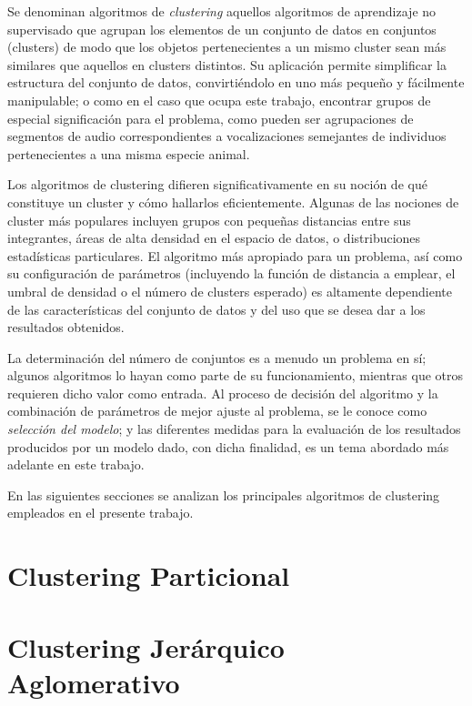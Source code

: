 Se denominan algoritmos de \textit{clustering} aquellos algoritmos de aprendizaje no supervisado que agrupan los elementos de un conjunto de datos en conjuntos (clusters) de modo que los objetos pertenecientes a un mismo cluster sean más similares que aquellos en clusters distintos.
Su aplicación permite simplificar la estructura del conjunto de datos, convirtiéndolo en uno más pequeño y fácilmente manipulable;
o como en el caso que ocupa este trabajo, encontrar grupos de especial significación para el problema, como pueden ser agrupaciones de segmentos de audio correspondientes a vocalizaciones semejantes de individuos pertenecientes a una misma especie animal.

Los algoritmos de clustering difieren significativamente en su noción de qué constituye un cluster y cómo hallarlos eficientemente.
Algunas de las nociones de cluster más populares incluyen grupos con pequeñas distancias entre sus integrantes, áreas de alta densidad en el espacio de datos, o distribuciones estadísticas particulares.
El algoritmo más apropiado para un problema, así como su configuración de parámetros (incluyendo la función de distancia a emplear, el umbral de densidad o el número de clusters esperado) es altamente dependiente de las características del conjunto de datos y del uso que se desea dar a los resultados obtenidos.

La determinación del número de conjuntos es a menudo un problema en sí;
algunos algoritmos lo hayan como parte de su funcionamiento, mientras que otros requieren dicho valor como entrada.
Al proceso de decisión del algoritmo y la combinación de parámetros de mejor ajuste al problema, se le conoce como \textit{selección del modelo};
y las diferentes medidas para la evaluación de los resultados producidos por un modelo dado, con dicha finalidad, es un tema abordado más adelante en este trabajo.

En las siguientes secciones se analizan los principales algoritmos de clustering empleados en el presente trabajo.

\section{Clustering Particional}\label{sec:clusteringParticional}


\section{Clustering Jerárquico Aglomerativo}\label{sec:clusteringJerárquicoAglomerativo}


